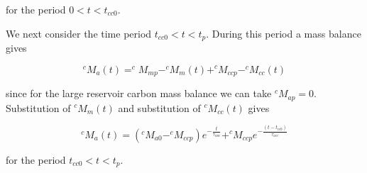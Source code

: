 for the period $0 < t < t_{cc0}$.

We next consider the time period $t_{cc0} < t < t_{p}$. During this period a mass balance gives

\begin{equation}
    ^cM_{a}(t) = ^cM_{mp} - ^cM_{m} (t) + ^cM_{ccp} - ^cM_{cc} (t)
\end{equation}

since for the large reservoir carbon mass balance we can take $^cM_{ap} = 0$. Substitution of $^cM_{m}(t)$ and substitution of $^cM_{cc}(t)$ gives

\begin{equation}
    ^cM_{a}(t) = (^cM_{a0} - ^cM_{ccp})e^{-\frac{t}{\tau_{am}}} + ^cM_{ccp} e^{-\frac{(t-t_{cc0})}{\tau_{acc}}}
\end{equation}

for the period $t_{cc0} < t < t_p$.


